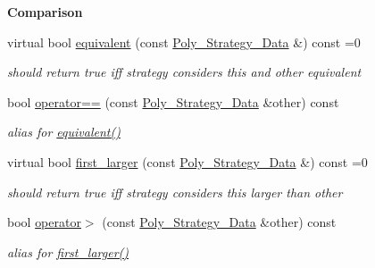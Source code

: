 \begin{Indent}\textbf{ Comparison}\par
\begin{DoxyCompactItemize}
\item 
\mbox{\label{class_poly___strategy___data_aa82a57a8bf9b3c14fd65a573fd78a4a5}} 
virtual bool \hyperlink{class_poly___strategy___data_aa82a57a8bf9b3c14fd65a573fd78a4a5}{equivalent} (const \hyperlink{class_poly___strategy___data}{Poly\+\_\+\+Strategy\+\_\+\+Data} \&) const =0
\begin{DoxyCompactList}\small\item\em should return {\ttfamily true} iff strategy considers {\ttfamily this} and other equivalent \end{DoxyCompactList}\item 
\mbox{\label{class_poly___strategy___data_a5c88b8a0a17d4175bf43ccab5d7ded4f}} 
bool \hyperlink{class_poly___strategy___data_a5c88b8a0a17d4175bf43ccab5d7ded4f}{operator==} (const \hyperlink{class_poly___strategy___data}{Poly\+\_\+\+Strategy\+\_\+\+Data} \&other) const
\begin{DoxyCompactList}\small\item\em alias for \hyperlink{class_poly___strategy___data_aa82a57a8bf9b3c14fd65a573fd78a4a5}{equivalent()} \end{DoxyCompactList}\item 
\mbox{\label{class_poly___strategy___data_a6cd4608015a6b0f06141b9b73b0d4137}} 
virtual bool \hyperlink{class_poly___strategy___data_a6cd4608015a6b0f06141b9b73b0d4137}{first\+\_\+larger} (const \hyperlink{class_poly___strategy___data}{Poly\+\_\+\+Strategy\+\_\+\+Data} \&) const =0
\begin{DoxyCompactList}\small\item\em should return {\ttfamily true} iff strategy considers {\ttfamily this} larger than other \end{DoxyCompactList}\item 
\mbox{\label{class_poly___strategy___data_a4100b95343145b454dca2978545dd791}} 
bool \hyperlink{class_poly___strategy___data_a4100b95343145b454dca2978545dd791}{operator$>$} (const \hyperlink{class_poly___strategy___data}{Poly\+\_\+\+Strategy\+\_\+\+Data} \&other) const
\begin{DoxyCompactList}\small\item\em alias for \hyperlink{class_poly___strategy___data_a6cd4608015a6b0f06141b9b73b0d4137}{first\+\_\+larger()} \end{DoxyCompactList}\item 

\end{DoxyCompactItemize}
\end{Indent}
